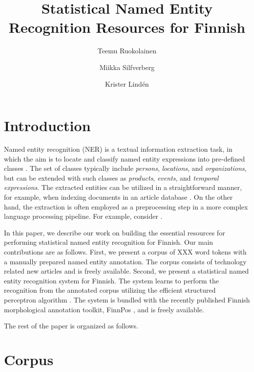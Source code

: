 \documentclass[11pt]{article}
\begin{document}
\title{Statistical Named Entity Recognition Resources for Finnish}
\author{Teemu Ruokolainen \and Miikka Silfverberg \and Krister Lind\'en}



\maketitle


\begin{abstract}
\noindent 

\end{abstract}

\section{Introduction}
\label{sec: introduction}

Named entity recognition (NER) is a textual information extraction task, in which the aim is to locate and classify named entity expressions into pre-defined classes \citep{}. The set of classes typically include \textit{persons}, \textit{locations}, and \textit{organizations}, but can be extended with such classes as \textit{products}, \textit{events}, and \textit{temporal expressions}. The extracted entities can be utilized in a straightforward manner, for example, when indexing documents in an article database \citep{}. On the other hand, the extraction is often employed as a preprocessing step in a more complex language processing pipeline. For example, consider .

In this paper, we describe our work on building the essential resources for performing statistical named entity recognition for Finnish. Our main contributions are as follows. First, we present a corpus of XXX word tokens with a manually prepared named entity annotation. The corpus consists of technology related new articles and is freely available. Second, we present a statistical named entity recognition system for Finnish. The system learns to perform the recognition from the annotated corpus utilizing the efficient structured perceptron algorithm \citep{collins2002}. The system is bundled with the recently published Finnish morphological annotation toolkit, FinnPos \citep{silfverberg2016}, and is freely available.

The rest of the paper is organized as follows.




\section{Corpus}
\label{sec: corpus}
\end{document}
